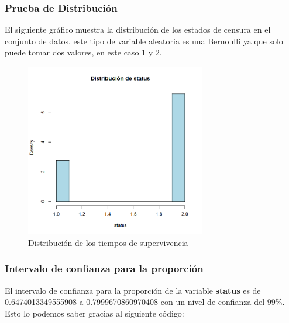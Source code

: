 \documentclass[a4paper,12pt]{article}
\begin{document}
\newpage
\subsubsection*{Prueba de Distribución}

El siguiente gráfico muestra la distribución de los estados de censura en el conjunto de datos, este tipo de variable aleatoria es una Bernoulli ya que solo puede tomar dos valores, en este caso 1 y 2.

\begin{figure}[h]
    \centering
    \includegraphics[width=0.7\textwidth]{distribucion_status.png}
    \caption{Distribución de los tiempos de supervivencia}
    \label{fig:status_distribution}
\end{figure}

\subsubsection*{Intervalo de confianza para la proporción}

El intervalo de confianza para la proporción de la variable \textbf{status} es de 0.6474013349555908 a 0.7999670860970408 con un nivel de confianza del 99\%. Esto lo podemos saber gracias al siguiente código:
\end{document}
